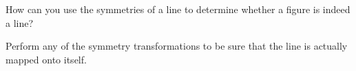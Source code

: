 \documentclass[nooutcomes]{ximera}
\begin{document}

\begin{question}
How can you use the symmetries of a line to determine whether a figure is indeed a line? 
\begin{freeResponse}
\end{freeResponse}
\begin{hint}
Perform any of the symmetry transformations to be sure that the line is actually mapped onto itself.  
\end{hint}
\end{question}

\end{document}
